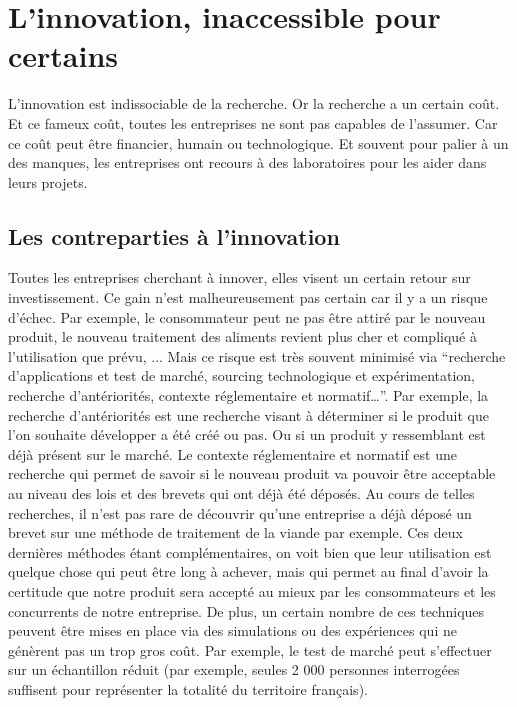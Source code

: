 \documentclass[a4paper,12pt]{report}
\begin{document}
	\section{L'innovation, inaccessible pour certains}
		L’innovation est indissociable de la recherche. Or la recherche a un certain coût. Et ce fameux coût, toutes les entreprises ne sont pas capables de l’assumer. Car ce coût peut être financier, humain ou technologique. Et souvent pour palier à un des manques, les entreprises ont recours à des laboratoires pour les aider dans leurs projets.
		
		\subsection{Les contreparties à l'innovation}
		
		Toutes les entreprises cherchant à innover, elles visent un certain retour sur investissement. Ce gain n’est malheureusement pas certain car il y a un risque d'échec. Par exemple, le consommateur peut ne pas être attiré par le nouveau produit, le nouveau traitement des aliments revient plus cher et compliqué à l’utilisation que prévu, ... Mais ce risque est très souvent minimisé via “recherche d’applications et test de marché, sourcing technologique et expérimentation, recherche d’antériorités, contexte réglementaire et  normatif…”\cite{GlobalVision}. Par exemple, la recherche d'antériorités est une recherche visant à déterminer si le produit que l'on souhaite développer a été créé ou pas. Ou si un produit y ressemblant est déjà présent sur le marché. Le contexte réglementaire et normatif est une recherche qui permet de savoir si le nouveau produit va pouvoir être acceptable au niveau des lois et des brevets qui ont déjà été déposés. Au cours de telles recherches, il n'est pas rare de découvrir qu'une entreprise a déjà déposé un brevet sur une méthode de traitement de la viande par exemple. Ces deux dernières méthodes étant complémentaires, on voit bien que leur utilisation est quelque chose qui peut être long à achever, mais qui permet au final d'avoir la certitude que notre produit sera accepté au mieux par les consommateurs et les concurrents de notre entreprise. De plus, un certain nombre de ces techniques peuvent être mises en place via des simulations ou des expériences qui ne génèrent pas un trop gros coût. Par exemple, le test de marché peut s'effectuer sur un échantillon réduit (par exemple, seules 2 000 personnes interrogées suffisent pour représenter la totalité du territoire français).\cite{Probas}
		
\end{document}
